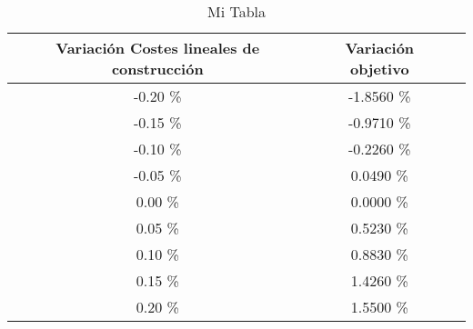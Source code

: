 \begin{table}
\centering
\begin{tabular}{|c|c|c|}
\hline
 Variación Costes lineales de construcción & Variación objetivo \\ \hline
-0.20 \% & -1.8560 \% \\ \hline
-0.15 \% & -0.9710 \% \\ \hline
-0.10 \% & -0.2260 \% \\ \hline
-0.05 \% & 0.0490 \% \\ \hline
0.00 \% & 0.0000 \% \\ \hline
0.05 \% & 0.5230 \% \\ \hline
0.10 \% & 0.8830 \% \\ \hline
0.15 \% & 1.4260 \% \\ \hline
0.20 \% & 1.5500 \% \\ \hline
\end{tabular}
\caption{Mi Tabla}
\end{table}
